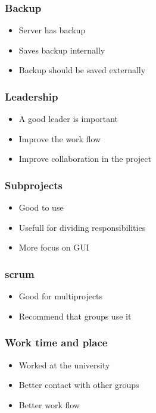 \begin{frame}
	\frametitle{Backup}
	\begin{itemize}
		\item Server has backup
		\item Saves backup internally
		\item Backup should be saved externally
	\end{itemize}
\end{frame}

\begin{frame}
	\frametitle{Leadership}
	\begin{itemize}
		\item A good leader is important
		\item Improve the work flow
		\item Improve collaboration in the project
	\end{itemize}
\end{frame}

\begin{frame}
	\frametitle{Subprojects}
	\begin{itemize}
		\item Good to use
		\item Usefull for dividing responsibilities
		\item More focus on GUI
	\end{itemize}
\end{frame}

\begin{frame}
	\frametitle{scrum}
	\begin{itemize}
		\item Good for multiprojects
		\item Recommend that groups use it
	\end{itemize}
\end{frame}

\begin{frame}
	\frametitle{Work time and place}
	\begin{itemize}
		\item Worked at the university
		\item Better contact with other groups
		\item Better work flow
	\end{itemize}
\end{frame}
